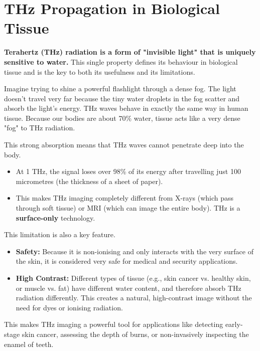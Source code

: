 
\chapter{THz Propagation in Biological Tissue}
\label{ch:thz-bio-propagation}

\begin{nontechnical}
    \textbf{Terahertz (THz) radiation is a form of "invisible light" that is uniquely sensitive to water.} This single property defines its behaviour in biological tissue and is the key to both its usefulness and its limitations.

    Imagine trying to shine a powerful flashlight through a dense fog. The light doesn't travel very far because the tiny water droplets in the fog scatter and absorb the light's energy. THz waves behave in exactly the same way in human tissue. Because our bodies are about 70\% water, tissue acts like a very dense "fog" to THz radiation.

    This strong absorption means that THz waves cannot penetrate deep into the body.
    \begin{itemize}
        \item At 1 THz, the signal loses over 98\% of its energy after travelling just 100 micrometres (the thickness of a sheet of paper).
        \item This makes THz imaging completely different from X-rays (which pass through soft tissue) or MRI (which can image the entire body). THz is a \textbf{surface-only} technology.
    \end{itemize}

    This limitation is also a key feature.
    \begin{itemize}
        \item \textbf{Safety:} Because it is non-ionising and only interacts with the very surface of the skin, it is considered very safe for medical and security applications.
        \item \textbf{High Contrast:} Different types of tissue (e.g., skin cancer vs. healthy skin, or muscle vs. fat) have different water content, and therefore absorb THz radiation differently. This creates a natural, high-contrast image without the need for dyes or ionising radiation.
    \end{itemize}
    This makes THz imaging a powerful tool for applications like detecting early-stage skin cancer, assessing the depth of burns, or non-invasively inspecting the enamel of teeth.
\end{nontechnical}


